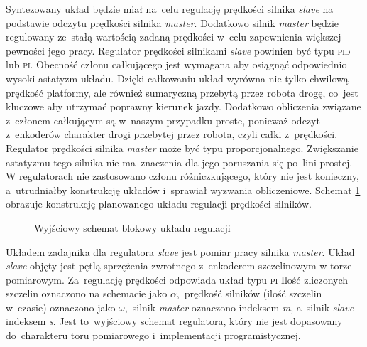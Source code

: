 \documentclass[11pt]{article}
\begin{document}
Syntezowany układ będzie miał na~celu regulację prędkości silnika \textit{slave} na podstawie odczytu prędkości silnika \textit{master}. Dodatkowo silnik \textit{master} będzie regulowany ze~stałą wartością zadaną prędkości w~celu zapewnienia większej pewności jego pracy.
Regulator prędkości silnikami \textit{slave} powinien być typu \textsc{pid} lub \textsc{pi}.
Obecność członu całkującego jest wymagana aby osiągnąć odpowiednio wysoki astatyzm układu.
Dzięki całkowaniu układ wyrówna nie tylko chwilową prędkość platformy, ale również sumaryczną przebytą przez robota drogę, co~jest kluczowe aby utrzymać poprawny kierunek jazdy.
Dodatkowo obliczenia związane z~członem całkującym są w~naszym przypadku proste, ponieważ odczyt z~enkoderów charakter drogi przebytej przez robota, czyli całki z~prędkości.
Regulator prędkości silnika \textit{master} może być typu proporcjonalnego.
Zwiększanie astatyzmu tego silnika nie ma~znaczenia dla jego poruszania się po~lini prostej.
W regulatorach nie zastosowano członu różniczkującego, który nie jest konieczny, a~utrudniałby konstrukcję układów i~sprawiał wyzwania obliczeniowe.
Schemat \ref{fig:tikz:control_block_1} obrazuje konstrukcję planowanego układu regulacji prędkości silników.
\begin{figure}[htbp]
	\centering
	
	\caption{Wyjściowy schemat blokowy układu regulacji}
	\label{fig:tikz:control_block_1}
\end{figure}
Układem zadajnika dla regulatora \textit{slave} jest pomiar pracy silnika \textit{master}.
Układ \textit{slave} objęty jest pętlą sprzężenia zwrotnego z~enkoderem szczelinowym w torze pomiarowym.
Za~regulację prędkości odpowiada układ typu \textsc{pi}
Ilość zliczonych szczelin oznaczono na schemacie jako $ \alpha $,~prędkość silników (ilość szczelin w~czasie) oznaczono jako $ \omega $,~silnik \textit{master} oznaczono indeksem \textit{m}, a~silnik \textit{slave} indeksem \textit{s}.
Jest to~wyjściowy schemat regulatora, który nie jest dopasowany do~charakteru toru pomiarowego i~implementacji programistycznej.
\end{document}
